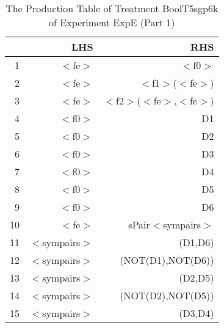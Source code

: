 \begin{table}[ht]
\centering
\begin{tabular}{rrr}
  \hline
 & LHS & RHS \\ 
  \hline
1 & $<$fe$>$ & $<$f0$>$ \\ 
  2 & $<$fe$>$ & $<$f1$>$($<$fe$>$) \\ 
  3 & $<$fe$>$ & $<$f2$>$($<$fe$>$,$<$fe$>$) \\ 
  4 & $<$f0$>$ & D1 \\ 
  5 & $<$f0$>$ & D2 \\ 
  6 & $<$f0$>$ & D3 \\ 
  7 & $<$f0$>$ & D4 \\ 
  8 & $<$f0$>$ & D5 \\ 
  9 & $<$f0$>$ & D6 \\ 
  10 & $<$fe$>$ & sPair$<$sympairs$>$ \\ 
  11 & $<$sympairs$>$ & (D1,D6) \\ 
  12 & $<$sympairs$>$ & (NOT(D1),NOT(D6)) \\ 
  13 & $<$sympairs$>$ & (D2,D5) \\ 
  14 & $<$sympairs$>$ & (NOT(D2),NOT(D5)) \\ 
  15 & $<$sympairs$>$ & (D3,D4) \\ 
   \hline
\end{tabular}
\caption{The Production Table of Treatment BoolT5sgp6k of Experiment ExpE (Part 1)} 
\end{table}
